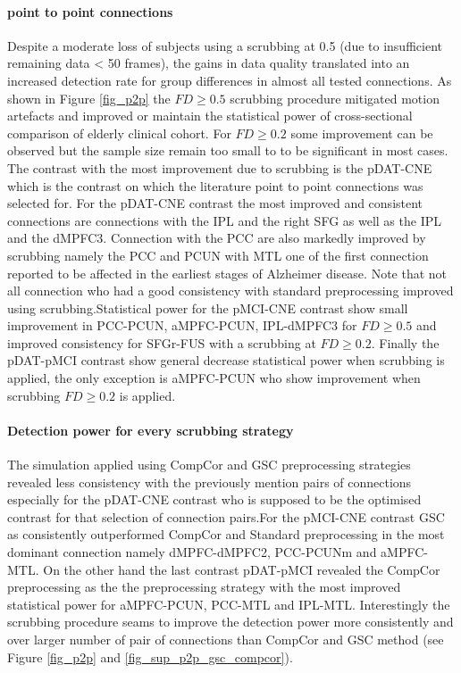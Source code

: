 \documentclass[authoryear]{elsarticle}
\begin{document}
\paragraph{point to point connections}
Despite a moderate loss of subjects using a scrubbing at 0.5 (due to insufficient remaining data < 50 frames), the gains in data quality translated into an increased detection rate for group differences in almost all tested connections. As shown in Figure \ref{fig_p2p} the $FD\geq0.5$ scrubbing procedure mitigated motion artefacts and improved or maintain the statistical power of cross-sectional comparison of elderly clinical cohort. For $FD\geq0.2$ some improvement can be observed but the sample size remain too small to to be significant in most cases. The contrast with the most improvement due to scrubbing is the pDAT-CNE which is the contrast on which the literature point to point connections was selected for. For the pDAT-CNE contrast the most improved and consistent connections are connections with the IPL and the right SFG as well as the IPL and the dMPFC3. Connection with the PCC are also markedly improved by scrubbing namely the PCC and PCUN with MTL one of the first connection reported to be affected in the earliest stages of Alzheimer disease. Note that not all connection who had a good consistency with standard preprocessing improved using scrubbing.Statistical power for the pMCI-CNE contrast show small improvement in PCC-PCUN, aMPFC-PCUN, IPL-dMPFC3 for $FD\geq0.5$ and improved consistency for SFGr-FUS with a scrubbing at $FD\geq0.2$. Finally the pDAT-pMCI contrast show general decrease statistical power when scrubbing is applied, the only exception is aMPFC-PCUN who show improvement when scrubbing $FD\geq0.2$ is applied.


\paragraph{Detection power for every scrubbing strategy}
The simulation applied using CompCor and GSC preprocessing strategies revealed less consistency with the previously mention pairs of connections especially for the pDAT-CNE contrast who is supposed to be the optimised contrast for that selection of connection pairs.For the pMCI-CNE contrast GSC as consistently outperformed CompCor and Standard preprocessing in the most dominant connection namely dMPFC-dMPFC2, PCC-PCUNm and aMPFC-MTL. On the other hand the last contrast pDAT-pMCI revealed the CompCor preprocessing as the the preprocessing strategy with the most improved statistical power for aMPFC-PCUN, PCC-MTL and IPL-MTL. Interestingly the scrubbing procedure seams to improve the detection power more consistently and over larger number of pair of connections than CompCor and GSC method (see Figure \ref{fig_p2p} and \ref{fig_sup_p2p_gsc_compcor}).
\end{document}
